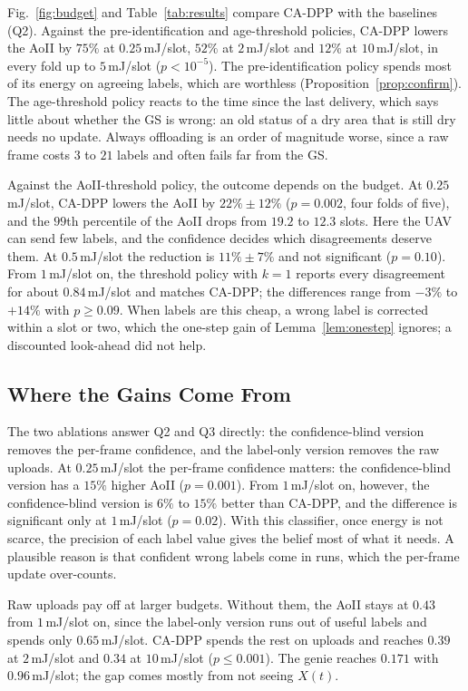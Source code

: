 \documentclass[10pt,journal,compsoc]{IEEEtran}
\theoremstyle{remark}
\begin{document}
Fig.~\ref{fig:budget} and Table~\ref{tab:results} compare CA-DPP with the baselines (Q2). Against the pre-identification and age-threshold policies, CA-DPP lowers the AoII by $75\%$ at $0.25$\,mJ/slot, $52\%$ at $2$\,mJ/slot and $12\%$ at $10$\,mJ/slot, in every fold up to $5$\,mJ/slot ($p<10^{-5}$). The pre-identification policy spends most of its energy on agreeing labels, which are worthless (Proposition~\ref{prop:confirm}). The age-threshold policy reacts to the time since the last delivery, which says little about whether the GS is wrong: an old status of a dry area that is still dry needs no update. Always offloading is an order of magnitude worse, since a raw frame costs $3$ to $21$ labels and often fails far from the GS.

Against the AoII-threshold policy, the outcome depends on the budget. At $0.25$\,mJ/slot, CA-DPP lowers the AoII by $22\%\pm12\%$ ($p=0.002$, four folds of five), and the $99$th percentile of the AoII drops from $19.2$ to $12.3$ slots. Here the UAV can send few labels, and the confidence decides which disagreements deserve them. At $0.5$\,mJ/slot the reduction is $11\%\pm7\%$ and not significant ($p=0.10$). From $1$\,mJ/slot on, the threshold policy with $k=1$ reports every disagreement for about $0.84$\,mJ/slot and matches CA-DPP; the differences range from $-3\%$ to $+14\%$ with $p\ge0.09$. When labels are this cheap, a wrong label is corrected within a slot or two, which the one-step gain of Lemma~\ref{lem:onestep} ignores; a discounted look-ahead did not help.


\subsection{Where the Gains Come From}\label{res:gains}
The two ablations answer Q2 and Q3 directly: the confidence-blind version removes the per-frame confidence, and the label-only version removes the raw uploads. At $0.25$\,mJ/slot the per-frame confidence matters: the confidence-blind version has a $15\%$ higher AoII ($p=0.001$). From $1$\,mJ/slot on, however, the confidence-blind version is $6\%$ to $15\%$ better than CA-DPP, and the difference is significant only at $1$\,mJ/slot ($p=0.02$). With this classifier, once energy is not scarce, the precision of each label value gives the belief most of what it needs. A plausible reason is that confident wrong labels come in runs, which the per-frame update over-counts.

Raw uploads pay off at larger budgets. Without them, the AoII stays at $0.43$ from $1$\,mJ/slot on, since the label-only version runs out of useful labels and spends only $0.65$\,mJ/slot. CA-DPP spends the rest on uploads and reaches $0.39$ at $2$\,mJ/slot and $0.34$ at $10$\,mJ/slot ($p\le0.001$). The genie reaches $0.171$ with $0.96$\,mJ/slot; the gap comes mostly from not seeing $X(t)$.
\end{document}
